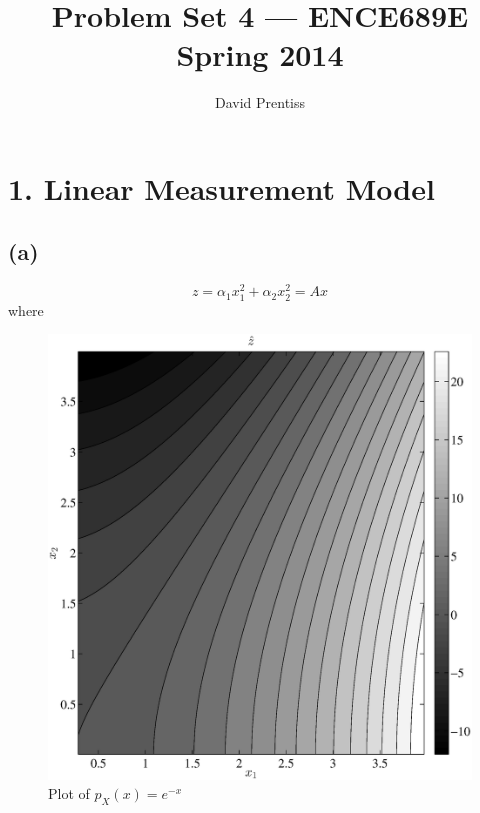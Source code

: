 \documentclass[fleqn, letterpaper]{tufte-handout}
\title{Problem Set 4 --- ENCE689E Spring 2014}
\author{David Prentiss}
\begin{document}
\maketitle

\section{1. Linear Measurement Model}
\subsection{(a)}
\[z = \alpha_1x_1^2+\alpha_2x_2^2 = Ax\]
where 
\begin{figure}
        \includegraphics[width=\textwidth]{problem1d}
        \caption{Plot of $p_X(x)=e^{-x}$}
        \label{exprnd}
\end{figure}

{\small
\begin{minipage}{\linewidth}
        
\end{minipage}
}
\end{document}
